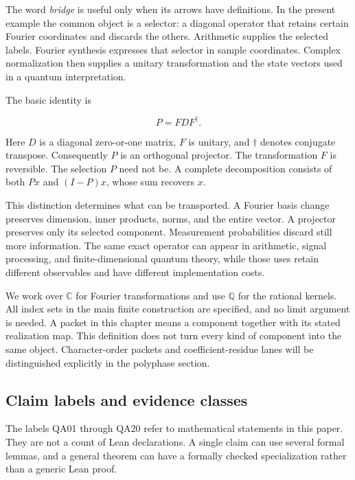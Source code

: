 The word \emph{bridge} is useful only when its arrows have definitions.
In the present example the common object is a selector: a diagonal
operator that retains certain Fourier coordinates and discards the
others. Arithmetic supplies the selected labels. Fourier synthesis
expresses that selector in sample coordinates. Complex normalization
then supplies a unitary transformation and the state vectors used in a
quantum interpretation.

The basic identity is

\[
P=FDF^\dagger.
\]

Here \(D\) is a diagonal zero-or-one matrix, \(F\) is unitary, and
\(\dagger\) denotes conjugate transpose. Consequently \(P\) is an
orthogonal projector. The transformation \(F\) is reversible. The
selection \(P\) need not be. A complete decomposition consists of both
\(Px\) and \((I-P)x\), whose sum recovers \(x\).

This distinction determines what can be transported. A Fourier basis
change preserves dimension, inner products, norms, and the entire
vector. A projector preserves only its selected component. Measurement
probabilities discard still more information. The same exact operator
can appear in arithmetic, signal processing, and finite-dimensional
quantum theory, while those uses retain different observables and have
different implementation costs.

We work over \(\mathbb C\) for Fourier transformations and use
\(\mathbb Q\) for the rational kernels. All index sets in the main
finite construction are specified, and no limit argument is needed. A
packet in this chapter means a component together with its stated
realization map. This definition does not turn every kind of component
into the same object. Character-order packets and coefficient-residue
lanes will be distinguished explicitly in the polyphase section.

\hypertarget{q:claim-labels-and-evidence-classes}{%
\subsection{Claim labels and evidence
classes}\label{q:claim-labels-and-evidence-classes}}

The labels QA01 through QA20 refer to mathematical statements in this
paper. They are not a count of Lean declarations. A single claim can use
several formal lemmas, and a general theorem can have a formally checked
specialization rather than a generic Lean proof.

